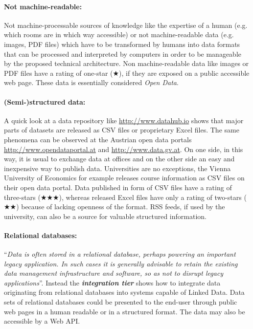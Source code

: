 \documentclass{article}
\begin{document}
\paragraph{Not machine-readable:} Not machine-processable sources of knowledge like the expertise of a human (e.g. which rooms are in which way accessible) or not machine-readable data (e.g. images, PDF files) which have to be transformed by humans into data formats that can be processed and interpreted by computers in order to be manageable by the proposed technical architecture. Non machine-readable data like images or PDF files have a rating of one-star ($\bigstar$), if they are exposed on a public accessible web page. These data is essentially considered \textit{Open Data}.

\paragraph{(Semi-)structured data:} A quick look at a data repository like \url{http://www.datahub.io} shows that major parts of datasets are released as CSV files or proprietary Excel files. The same phenomena can be observed at the Austrian open data portals \url{http://www.opendataportal.at} and \url{http://www.data.gv.at}. On one side, in this way, it is usual to exchange data at offices and on the other side an easy and inexpensive way to publish data. Universities are no exceptions, the Vienna University of Economics for example releases course information as CSV files on their open data portal. Data published in form of CSV files have a rating of three-stars ($\bigstar\bigstar\bigstar$), whereas released Excel files have only a rating of two-stars ($\bigstar\bigstar$) because of lacking openness of the format. RSS feeds, if used by the university, can also be a source for valuable structured information.

\paragraph{Relational databases:} ``\textit{Data is often stored in a relational database, perhaps powering an important legacy application. In such cases it is generally advisable to retain the existing data management infrastructure and software, so as not to disrupt legacy applications}''.\cite{heath_linked_2011} Instead the \textit{\textbf{integration tier}} shows how to integrate data originating from relational databases into systems capable of Linked Data. Data sets of relational databases could be presented to the end-user through public web pages in a human readable or in a structured format. The data may also be accessible by a Web API.
\end{document}
